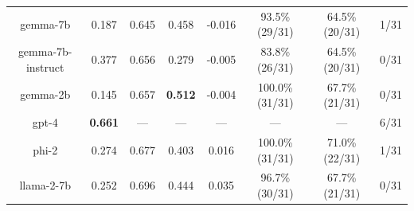 \begin{table}[ht]
{\begin{tabular}{cccccccc}
gemma-7b             & 0.187                & 0.645                & 0.458                                                                   & -0.016                                                                              & 93.5\% (29/31)                                                                      & 64.5\% (20/31)                                                                     & 1/31                                                                        \\
gemma-7b-instruct    & 0.377                & 0.656                & 0.279                                                                   & -0.005                                                                              & 83.8\% (26/31)                                                                      & 64.5\% (20/31)                                                                     & 0/31                                                                        \\
gemma-2b             & 0.145                & 0.657                & \textbf{0.512}                                                          & -0.004                                                                              & 100.0\% (31/31)                                                                     & 67.7\% (21/31)                                                                     & 0/31                                                                        \\
gpt-4                & \textbf{0.661}       & ---                  & ---                                                                     & ---                                                                                 & ---                                                                                 & ---                                                                                & 6/31                                                                        \\
phi-2                & 0.274                & 0.677                & 0.403                                                                   & 0.016                                                                               & 100.0\% (31/31)                                                                     & 71.0\% (22/31)                                                                     & 1/31                                                                        \\
llama-2-7b           & 0.252                & 0.696                & 0.444                                                                   & 0.035                                                                               & 96.7\% (30/31)                                                                      & 67.7\% (21/31)                                                                     & 0/31                                                                        \\

\end{tabular}}
\end{table}
